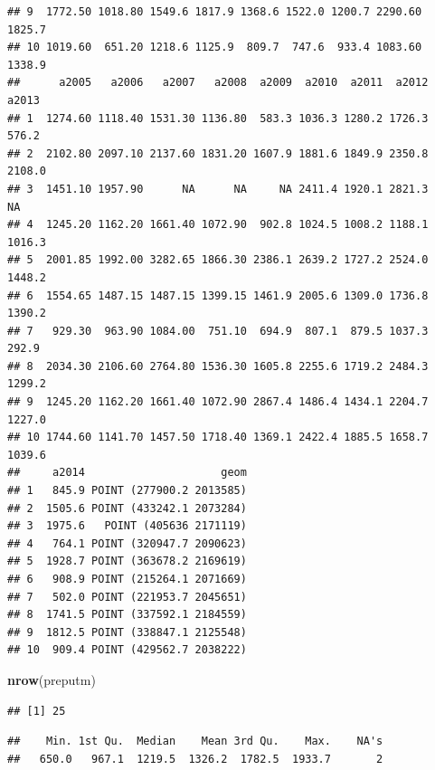 \documentclass[11pt,]{article}
\newenvironment{Shaded}{\begin{snugshade}}{\end{snugshade}}
\newcommand{\KeywordTok}[1]{\textcolor[rgb]{0.13,0.29,0.53}{\textbf{#1}}}
\newcommand{\OperatorTok}[1]{\textcolor[rgb]{0.81,0.36,0.00}{\textbf{#1}}}
\newcommand{\NormalTok}[1]{#1}
\begin{document}
\begin{verbatim}
## 9  1772.50 1018.80 1549.6 1817.9 1368.6 1522.0 1200.7 2290.60 1825.7
## 10 1019.60  651.20 1218.6 1125.9  809.7  747.6  933.4 1083.60 1338.9
##      a2005   a2006   a2007   a2008  a2009  a2010  a2011  a2012  a2013
## 1  1274.60 1118.40 1531.30 1136.80  583.3 1036.3 1280.2 1726.3  576.2
## 2  2102.80 2097.10 2137.60 1831.20 1607.9 1881.6 1849.9 2350.8 2108.0
## 3  1451.10 1957.90      NA      NA     NA 2411.4 1920.1 2821.3     NA
## 4  1245.20 1162.20 1661.40 1072.90  902.8 1024.5 1008.2 1188.1 1016.3
## 5  2001.85 1992.00 3282.65 1866.30 2386.1 2639.2 1727.2 2524.0 1448.2
## 6  1554.65 1487.15 1487.15 1399.15 1461.9 2005.6 1309.0 1736.8 1390.2
## 7   929.30  963.90 1084.00  751.10  694.9  807.1  879.5 1037.3  292.9
## 8  2034.30 2106.60 2764.80 1536.30 1605.8 2255.6 1719.2 2484.3 1299.2
## 9  1245.20 1162.20 1661.40 1072.90 2867.4 1486.4 1434.1 2204.7 1227.0
## 10 1744.60 1141.70 1457.50 1718.40 1369.1 2422.4 1885.5 1658.7 1039.6
##     a2014                     geom
## 1   845.9 POINT (277900.2 2013585)
## 2  1505.6 POINT (433242.1 2073284)
## 3  1975.6   POINT (405636 2171119)
## 4   764.1 POINT (320947.7 2090623)
## 5  1928.7 POINT (363678.2 2169619)
## 6   908.9 POINT (215264.1 2071669)
## 7   502.0 POINT (221953.7 2045651)
## 8  1741.5 POINT (337592.1 2184559)
## 9  1812.5 POINT (338847.1 2125548)
## 10  909.4 POINT (429562.7 2038222)
\end{verbatim}

\begin{Shaded}
\begin{Highlighting}[]
\KeywordTok{nrow}\NormalTok{(preputm)}
\end{Highlighting}
\end{Shaded}

\begin{verbatim}
## [1] 25
\end{verbatim}

\begin{Shaded}
\end{Shaded}

\begin{verbatim}
##    Min. 1st Qu.  Median    Mean 3rd Qu.    Max.    NA's 
##   650.0   967.1  1219.5  1326.2  1782.5  1933.7       2
\end{verbatim}

\begin{Shaded}
\end{Shaded}
\end{document}
